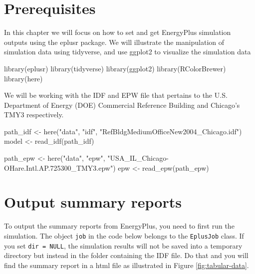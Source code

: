 \documentclass[
]{book}
\newenvironment{Shaded}{\begin{snugshade}}{\end{snugshade}}
\newcommand{\FunctionTok}[1]{\textcolor[rgb]{0.00,0.00,0.00}{#1}}
\newcommand{\NormalTok}[1]{#1}
\newcommand{\OtherTok}[1]{\textcolor[rgb]{0.56,0.35,0.01}{#1}}
\newcommand{\StringTok}[1]{\textcolor[rgb]{0.31,0.60,0.02}{#1}}
\begin{document}
\hypertarget{prerequisites-8}{%
\section{Prerequisites}\label{prerequisites-8}}

In this chapter we will focus on how to set and get EnergyPlus simulation outputs using the eplusr package. We will illustrate the manipulation of simulation data using tidyverse, and use ggplot2 to visualize the simulation data

\begin{Shaded}
\begin{Highlighting}[]
\FunctionTok{library}\NormalTok{(eplusr)}
\FunctionTok{library}\NormalTok{(tidyverse)}
\FunctionTok{library}\NormalTok{(ggplot2)}
\FunctionTok{library}\NormalTok{(RColorBrewer)}
\FunctionTok{library}\NormalTok{(here)}
\end{Highlighting}
\end{Shaded}

We will be working with the IDF and EPW file that pertains to the U.S. Department of Energy (DOE) Commercial Reference Building and Chicago's TMY3 respectively.

\begin{Shaded}
\begin{Highlighting}[]
\NormalTok{path\_idf }\OtherTok{\textless{}{-}} \FunctionTok{here}\NormalTok{(}\StringTok{"data"}\NormalTok{, }\StringTok{"idf"}\NormalTok{, }\StringTok{"RefBldgMediumOfficeNew2004\_Chicago.idf"}\NormalTok{)}
\NormalTok{model }\OtherTok{\textless{}{-}} \FunctionTok{read\_idf}\NormalTok{(path\_idf)}

\NormalTok{path\_epw }\OtherTok{\textless{}{-}} \FunctionTok{here}\NormalTok{(}\StringTok{"data"}\NormalTok{, }\StringTok{"epw"}\NormalTok{, }\StringTok{"USA\_IL\_Chicago{-}OHare.Intl.AP.725300\_TMY3.epw"}\NormalTok{)}
\NormalTok{epw }\OtherTok{\textless{}{-}} \FunctionTok{read\_epw}\NormalTok{(path\_epw)}
\end{Highlighting}
\end{Shaded}

\hypertarget{output-summary-reports}{%
\section{Output summary reports}\label{output-summary-reports}}

To output the summary reports from EnergyPlus, you need to first run the simulation. The object \texttt{job} in the code below belongs to the \texttt{EplusJob} class. If you set \texttt{dir\ =\ NULL}, the simulation results will not be saved into a temporary directory but instead in the folder containing the IDF file. Do that and you will find the summary report in a html file as illustrated in Figure \ref{fig:tabular-data}.
\end{document}
